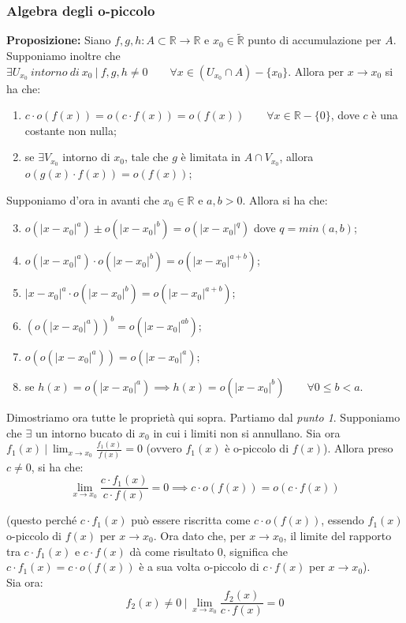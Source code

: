 \documentclass{article}
\begin{document}
\subsubsection{Algebra degli o-piccolo}
\textbf{Proposizione:} Siano $f, g, h: A \subset \mathbb{R} \xrightarrow{} \mathbb{R}$ e $x_0 \in \widetilde{\mathbb{R}}$ punto di accumulazione per $A$. Supponiamo inoltre che $\exists U_{x_0} \ intorno \ di \ x_0 \ | \ f, g, h \neq 0 \qquad \forall x \in (U_{x_0} \cap A) - \{x_0\}$. Allora per $x \to x_0$ si ha che:
\begin{enumerate}
    \item $c \cdot o(f(x)) = o(c \cdot f(x)) = o(f(x)) \qquad \forall x \in \mathbb{R} - \{0\}$, dove $c$ è una costante non nulla;
    \item se $\exists V_{x_0}$ intorno di $x_0$, tale che $g$ è limitata in $A \cap V_{x_0}$, allora $o(g(x) \cdot f(x)) = o(f(x))$;
\end{enumerate}

\noindent Supponiamo d'ora in avanti che $x_0 \in \mathbb{R}$ e $a, b > 0$. Allora si ha che:
\begin{enumerate}
    \setcounter{enumi}{2}
    \item $o(|x - x_0|^a) \pm o(|x - x_0|^b) = o(|x - x_0|^q)$ dove $q = min(a, b)$;
    \item $o(|x - x_0|^a) \cdot o(|x - x_0|^b) = o(|x - x_0|^{a + b})$;
    \item $|x - x_0|^a \cdot o(|x - x_0|^b) = o(|x - x_0|^{a + b})$;
    \item $(o(|x - x_0|^a))^b = o(|x - x_0|^{ab})$;
    \item $o(o(|x - x_0|^a)) = o(|x - x_0|^a)$;
    \item se $h(x) = o(|x - x_0|^a) \implies h(x) = o(|x - x_0|^b) \qquad \forall 0 \leq b < a$.
\end{enumerate}

\noindent Dimostriamo ora tutte le proprietà qui sopra. Partiamo dal \textit{punto 1}. Supponiamo che $\exists$ un intorno bucato di $x_0$ in cui i limiti non si annullano. Sia ora $f_1(x) \ | \ \lim_{x \to x_0} \frac{f_1(x)}{f(x)} = 0$ (ovvero $f_1(x)$ è o-piccolo di $f(x)$). Allora preso $c \neq 0$, si ha che:
\begin{equation*}
    \lim_{x \to x_0} \frac{c \cdot f_1(x)}{c \cdot f(x)} = 0 \implies c\cdot o(f(x)) = o(c \cdot f(x))
\end{equation*}

\noindent (questo perché $c \cdot f_1(x)$ può essere riscritta come $c \cdot o(f(x))$, essendo $f_1(x)$ o-piccolo di $f(x)$ per $x \to x_0$. Ora dato che, per $x \to x_0$, il limite del rapporto tra $c \cdot f_1(x)$ e $c \cdot f(x)$ dà come risultato $0$, significa che $c \cdot f_1(x) = c \cdot o(f(x))$ è a sua volta o-piccolo di $c \cdot f(x)$ per $x \to x_0$).\\
Sia ora:
\begin{equation*}
    f_2(x) \neq 0 \ | \ \lim_{x \to x_0} \frac{f_2(x)}{c \cdot f(x)} = 0 
\end{equation*}
\end{document}
